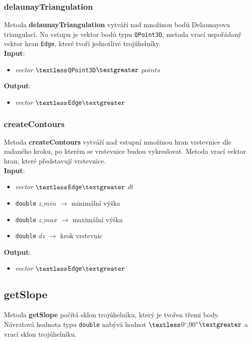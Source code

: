 \documentclass[a4paper, 12pt]{article}
\begin{document}
\subsubsection*{delaunayTriangulation}
Metoda \textbf{delaunayTriangulation} vytváří nad množinou bodů Delaunayovu triangulaci. Na vstupu je vektor bodů typu \texttt{QPoint3D}, metoda vrací uspořádaný vektor hran \texttt{Edge}, které tvoří jednotlivé trojúhelníky.\\

\textbf{Input}:
\begin{itemize}
\item \textsl{vector} $\textless$\texttt{QPoint3D}$\textgreater$ $points$
\end{itemize}

\textbf{Output}:
\begin{itemize}
\item \textsl{vector} $\textless$\texttt{Edge}$\textgreater$
\end{itemize}

\subsubsection*{createContours}
Metoda \textbf{createContours} vytváří nad vstupní množinou hran vrstevnice dle zadaného kroku, po kterém se vrstevnice budou vykreslovat.  Metoda vrací vektor hran, které před\-sta\-vu\-jí vrstevnice.\\

\textbf{Input}:
\begin{itemize}
\item \textsl{vector} $\textless$\texttt{Edge}$\textgreater$ $dt$
\item \texttt{double} $z\_min$ $\rightarrow$ minimální výška
\item \texttt{double} $z\_max$ $\rightarrow$ maximální výška
\item \texttt{double} $dz$ $\rightarrow$ krok vrstevnic
\end{itemize}

\textbf{Output}:
\begin{itemize}
\item \textsl{vector} $\textless$\texttt{Edge}$\textgreater$
\end{itemize}

\subsection*{getSlope}
Metoda \textbf{getSlope} počítá sklon trojúhelníku, který je tvořen třemi body. Návratová hodnota typu \texttt{double} nabývá hodnot $\textless$0$^\circ$;90$^\circ\textgreater$ a vrací sklon trojúhelníku.\\
\end{document}
